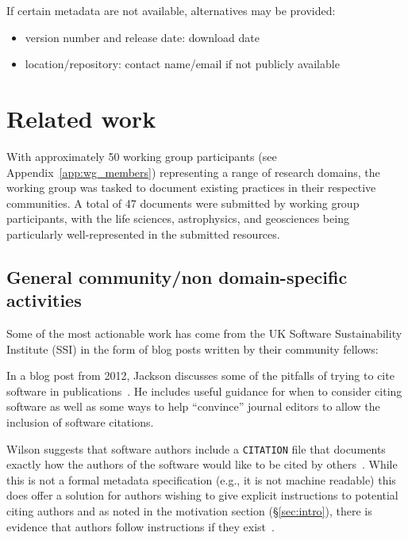 \documentclass[11pt, oneside]{amsart}
\begin{document}
If certain metadata are not available, alternatives may be provided:
\begin{itemize}
\item version number and release date: download date
\item location\slash repository: contact name\slash email if not publicly
  available
\end{itemize}


\section{Related work}
\label{sec:related_work}

With approximately 50 working group participants (see Appendix~\ref{app:wg_members})
representing a range of research domains, the working group was tasked to
document existing practices in their respective communities. A total of 47
documents were submitted by working group participants, with the life sciences,
astrophysics, and geosciences being particularly well-represented in the
submitted resources.

\subsection{General community/non domain-specific activities}

Some of the most actionable work has come from the UK Software Sustainability
Institute (SSI) in the form of blog posts written by their community fellows:

In a blog post from 2012, Jackson discusses some of the pitfalls of trying to
cite software in publications~\cite{ssi-how-to-cite}. He includes useful
guidance for when to consider citing software as well as some ways to help
``convince'' journal editors to allow the inclusion of software citations.

Wilson suggests that software authors include a \texttt{CITATION} file that
documents exactly how the authors of the software would like to be cited by
others~\cite{ssi-citation-files}. While this is not a formal metadata
specification (e.g., it is not machine readable) this does offer a solution for
authors wishing to give explicit instructions to potential citing authors and as
noted in the motivation section (\S\ref{sec:intro}), there is evidence that
authors follow instructions if they exist~\cite{10.1371/journal.pone.0136631}.
\end{document}
